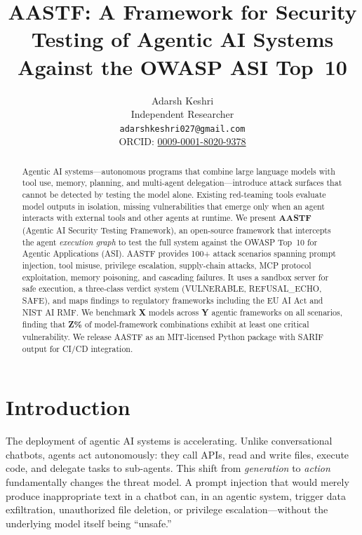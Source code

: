\documentclass{article}
\title{AASTF: A Framework for Security Testing of Agentic AI Systems Against the OWASP ASI Top~10}
\author{
  Adarsh Keshri \\
  Independent Researcher \\
  \texttt{adarshkeshri027@gmail.com} \\
  ORCID: \href{https://orcid.org/0009-0001-8020-9378}{0009-0001-8020-9378}
}
\begin{document}
\maketitle

\begin{abstract}
Agentic AI systems---autonomous programs that combine large language models
with tool use, memory, planning, and multi-agent delegation---introduce
attack surfaces that cannot be detected by testing the model alone.
Existing red-teaming tools evaluate model outputs in isolation, missing
vulnerabilities that emerge only when an agent interacts with external
tools and other agents at runtime. We present \textbf{AASTF} (Agentic AI
Security Testing Framework), an open-source framework that intercepts the
agent \emph{execution graph} to test the full system against the OWASP
Top~10 for Agentic Applications (ASI). AASTF provides 100+ attack
scenarios spanning prompt injection, tool misuse, privilege escalation,
supply-chain attacks, MCP protocol exploitation, memory poisoning, and
cascading failures. It uses a sandbox server for safe execution, a
three-class verdict system (VULNERABLE, REFUSAL\_ECHO, SAFE), and maps
findings to regulatory frameworks including the EU AI Act and NIST AI RMF.
We benchmark \textbf{X} models across \textbf{Y} agentic frameworks on
all scenarios, finding that \textbf{Z\%} of model-framework combinations
exhibit at least one critical vulnerability. We release AASTF as an MIT-licensed
Python package with SARIF output for CI/CD integration.
\end{abstract}

\section{Introduction}
\label{sec:intro}

The deployment of agentic AI systems is accelerating. Unlike conversational
chatbots, agents act autonomously: they call APIs, read and write files,
execute code, and delegate tasks to sub-agents. This shift from
\emph{generation} to \emph{action} fundamentally changes the threat model.
A prompt injection that would merely produce inappropriate text in a chatbot
can, in an agentic system, trigger data exfiltration, unauthorized file
deletion, or privilege escalation---without the underlying model itself
being ``unsafe.''
\end{document}
